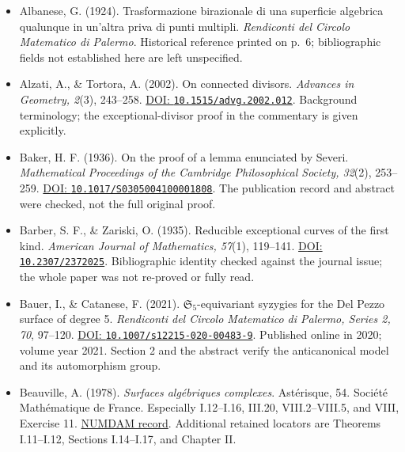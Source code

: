 \begin{sloppypar}
\begin{itemize}
\item Albanese, G. (1924). Trasformazione birazionale di una superficie algebrica qualunque in un'altra priva di punti multipli. \emph{Rendiconti del Circolo Matematico di Palermo}. Historical reference printed on p.~6; bibliographic fields not established here are left unspecified.

\item Alzati, A., \& Tortora, A. (2002). On connected divisors. \emph{Advances in Geometry, 2}(3), 243--258. \href{https://doi.org/10.1515/advg.2002.012}{DOI: \nolinkurl{10.1515/advg.2002.012}}. Background terminology; the exceptional-divisor proof in the commentary is given explicitly.

\item Baker, H. F. (1936). On the proof of a lemma enunciated by Severi. \emph{Mathematical Proceedings of the Cambridge Philosophical Society, 32}(2), 253--259. \href{https://doi.org/10.1017/S0305004100001808}{DOI: \nolinkurl{10.1017/S0305004100001808}}. The publication record and abstract were checked, not the full original proof.

\item Barber, S. F., \& Zariski, O. (1935). Reducible exceptional curves of the first kind. \emph{American Journal of Mathematics, 57}(1), 119--141. \href{https://doi.org/10.2307/2372025}{DOI: \nolinkurl{10.2307/2372025}}. Bibliographic identity checked against the journal issue; the whole paper was not re-proved or fully read.

\item Bauer, I., \& Catanese, F. (2021). \(\mathfrak S_5\)-equivariant syzygies for the Del Pezzo surface of degree 5. \emph{Rendiconti del Circolo Matematico di Palermo, Series 2, 70}, 97--120. \href{https://doi.org/10.1007/s12215-020-00483-9}{DOI: \nolinkurl{10.1007/s12215-020-00483-9}}. Published online in 2020; volume year 2021. Section 2 and the abstract verify the anticanonical model and its automorphism group.

\item Beauville, A. (1978). \emph{Surfaces alg\'ebriques complexes}. Ast\'erisque, 54. Soci\'et\'e Math\'ematique de France. Especially I.12--I.16, III.20, VIII.2--VIII.5, and VIII, Exercise 11. \href{https://www.numdam.org/item/AST_1978__54__R1_0/}{NUMDAM record}. Additional retained locators are Theorems I.11--I.12, Sections I.14--I.17, and Chapter II.


\end{itemize}
\end{sloppypar}
